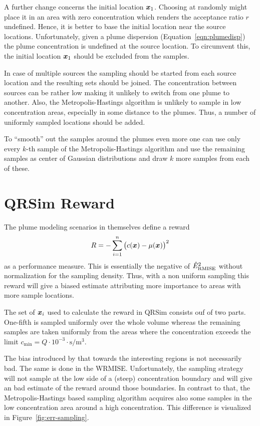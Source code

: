 A further change concerns the initial location $\bm{x}_1$. Choosing at randomly 
might place it in an area with zero concentration which renders the acceptance 
ratio $r$ undefined. Hence, it is better to base the initial location near the 
source locations. Unfortunately, given a plume dispersion 
(Equation~\ref{eqn:plumedisp}) the plume concentration is undefined at the 
source location. To circumvent this, the initial location $\bm{x}_1$ should be 
excluded from the samples.

In case of multiple sources the sampling should be started from each source 
location and the resulting sets should be joined. The concentration between 
sources can be rather low making it unlikely to switch from one plume to 
another. Also, the Metropolis-Hastings algorithm is unlikely to sample in low 
concentration areas, especially in some distance to the plumes. Thus, a number 
of uniformly sampled locations should be added.

To ``smooth'' out the samples around the plumes even more one can use only every 
$k$-th sample of the Metropolis-Hastings algorithm and use the remaining samples 
as center of Gaussian distributions and draw $k$ more samples from each of 
these.

\section{QRSim Reward}\label{sec:qrsim-reward}
The plume modeling scenarios in \textcite{denardi2013rn} themselves define 
a reward
\begin{equation}
    R = - \sum_{i = 1}^n \del{c(\vc x) - \mu(\vc x)}^2
\end{equation}
as a performance measure. This is essentially the negative of 
$\hat{E}_{\mathrm{RMISE}}^2$ without normalization for the sampling density. Thus, 
with a non uniform sampling this reward will give a biased estimate attributing 
more importance to areas with more sample locations.

The set of $\bm{x}_i$ used to calculate the reward in QRSim consists ouf of two 
parts. One-fifth is sampled uniformly over the whole volume whereas the 
remaining samples are taken uniformly from the areas where the concentration 
exceeds the limit $c_{\min} = Q \cdot 10^{-3} \cdot 
\si{\second\per\meter\cubed}$.

The bias introduced by that towards the interesting regions is not necessarily 
bad. The same is done in the WRMISE\@. Unfortunately, the sampling strategy will 
not sample at the low side of a (steep) concentration boundary and will give an 
bad estimate of the reward around those boundaries. In contrast to that, the 
Metropolis-Hastings based sampling algorithm acquires also some samples in the 
low concentration area around a high concentration.  This difference is 
visualized in Figure~\ref{fig:err-sampling}.

